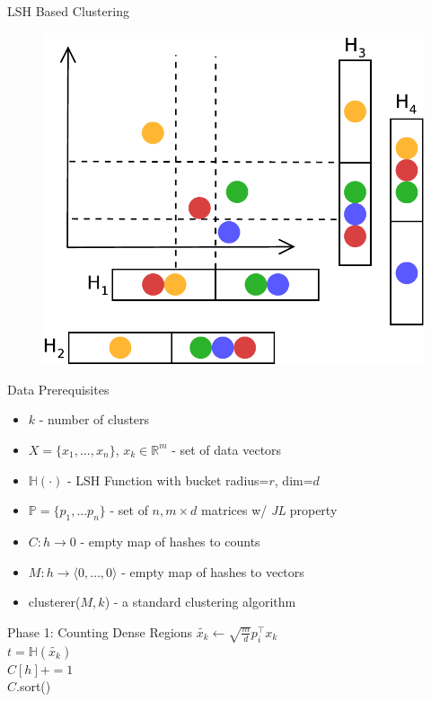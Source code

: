 \documentclass[12pt]{beamer}
\begin{document}
\begin{frame}[plain]{LSH Based Clustering}
 \begin{figure}
 \centerline{\includegraphics[width=.7\textwidth]{figs/multiLSHClustering}}
\end{figure}
\end{frame}


\begin{frame}[plain]{Data Prerequisites}
\begin{itemize}
    \item  $k$ - number of clusters\\
    \item$X=\{x_1, \dots, x_n\}$, $x_k \in \mathbb{R}^m$ - set of data vectors\\
    \item  $\mathbb{H}(\cdot)$ - LSH Function with bucket radius=$r$, dim=$d$\\
    \item  $\mathbb{P} = \{p_1,...p_n\}$ - set of $n, m \times d $ matrices w/ \emph{JL} property\\
    \item$C:h \rightarrow 0$ - empty map of hashes to counts\\
    \item$M : h\rightarrow \langle0, \dots, 0\rangle$ - empty map of hashes to vectors\\
    \item clusterer($M,k$) - a standard clustering algorithm
  \end{itemize}
\end{frame}

\begin{frame}[plain]{Phase 1: Counting Dense Regions}
    {
      {
	$\tilde{x_k}\leftarrow  \sqrt{\frac{m}{d}}p_i^{\intercal}x_k $\\ %
	$t = \mathbb{H}(\tilde{x_k})$\\%
	$C[h]+=1$\\%
      }
    }
    $C$.sort()\\%
\end{frame}
\end{document}
